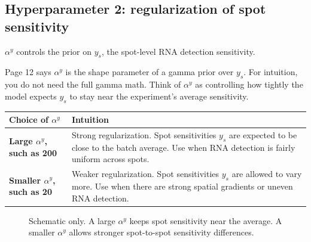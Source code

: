 \documentclass[11pt]{article}
\begin{document}
\subsection{Hyperparameter 2: regularization of spot sensitivity}

$\alpha^y$ controls the prior on $y_s$, the spot-level RNA detection sensitivity.

Page 12 says $\alpha^y$ is the shape parameter of a gamma prior over $y_s$. For intuition, you do not need the full gamma math. Think of $\alpha^y$ as controlling how tightly the model expects $y_s$ to stay near the experiment's average sensitivity.

\begin{center}
\begin{tabularx}{0.95\textwidth}{>{\bfseries}p{}X}
\toprule
Choice of $\alpha^y$ & Intuition \\
\midrule
Large $\alpha^y$, such as 200 & Strong regularization. Spot sensitivities $y_s$ are expected to be close to the batch average. Use when RNA detection is fairly uniform across spots. \\
Smaller $\alpha^y$, such as 20 & Weaker regularization. Spot sensitivities $y_s$ are allowed to vary more. Use when there are strong spatial gradients or uneven RNA detection. \\
\bottomrule
\end{tabularx}
\end{center}

\begin{figure}[H]
\centering
{}
\caption{Schematic only. A large $\alpha^y$ keeps spot sensitivity near the average. A smaller $\alpha^y$ allows stronger spot-to-spot sensitivity differences.}
\end{figure}
\end{document}
